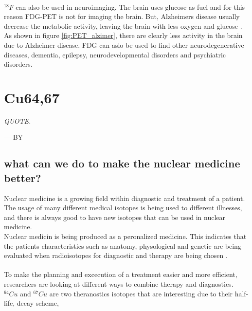 \documentclass[twoside,english]{uiofysmaster/uiofysmaster}
\begin{document}
\noindent
\\
$^{18}F$ can also be used in neuroimaging. The brain uses glucose as fuel and for this reason FDG-PET is not for imaging the brain. But, Alzheimers disease usually decrease the metabolic activity, leaving the brain with less oxygen and glucose \cite{18F_alzimer}. As shown in figure \ref{fig:PET_alzimer}, there are clearly less activity in the brain due to Alzheimer disease. FDG can aslo be used to find other neurodegenerative diseases, dementia, epilepsy, neurodevelopmental disorders and psychiatric disorders\cite{physics_in_medicine}.

\chapter{Cu64,67} 
\label{ch: mywork}

\epigraph{\itshape QUOTE.}{--- \textup{BY}}


\section{what can we do to make the nuclear medicine better?}
\label{sec: betterwork}

Nuclear medicine is a growing field within diagnostic and treatment of a patient. The usage of many different medical isotopes is being used to different illnesses, and there is always good to have new isotopes that can be used in nuclear medicine.\\
Nuclear medicin is being produced as a peronalized medicine. This indicates that the patients characteristics such as anatomy, physological and genetic are being evaluated when radioisotopes for diagnostic and therapy are being chosen \cite{Ahmedova2018}. 
\\
\\
To make the planning and excecution of a treatment easier and more efficient, researchers are looking at different ways to combine therapy and diagnostics. 
$^{64}Cu$ and $^{67}Cu$ are two theranostics isotopes that are interesting due to their half-life, decay scheme, 
\end{document}
